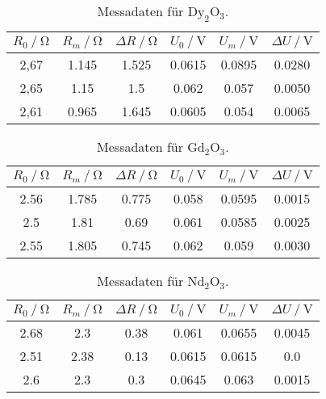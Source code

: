 \begin{table}[H]
    \centering
    \caption{Messadaten für $\text{Dy}_2 \text{O}_3$.}
    \label{tab:tab3}
    \begin{tabular}{S S S S S S}
      \toprule
        {$ R_0 \mathbin{/} \unit{\ohm} $}&{$R_m \mathbin{/} \unit{\ohm} $}&{$ \Delta R \mathbin{/} \unit{\ohm}$}&{$ U_0 \mathbin{/} \unit{\volt}$}&{$U_m \mathbin{/} \unit{\volt}$}&{$\Delta U \mathbin{/} \unit{\volt}$}\\
        \midrule
        {2,67} & {1.145}&  {1.525}&{0.0615}&{0.0895}&{0.0280}\\
        {2,65} & {1.15} &   {1.5} &{0.062} &{0.057} &{0.0050}\\
        {2,61} & {0.965}&  {1.645}&{0.0605}&{0.054} &{0.0065}\\
      \bottomrule
    \end{tabular}
\end{table}

\begin{table}[H]
    \centering
    \caption{Messadaten für $\text{Gd}_2 \text{O}_3$.}
    \label{tab:tab4}
    \begin{tabular}{S S S S S S}
      \toprule
        {$ R_0 \mathbin{/} \unit{\ohm} $}&{$R_m \mathbin{/} \unit{\ohm} $}&{$ \Delta R \mathbin{/} \unit{\ohm}$}&{$ U_0 \mathbin{/} \unit{\volt}$}&{$U_m \mathbin{/} \unit{\volt}$}&{$\Delta U \mathbin{/} \unit{\volt}$}\\
        \midrule
        {2.56} & {1.785}&  {0.775}&{0.058}&{0.0595}&{0.0015}\\
        {2.5}  & { 1.81}&   {0.69} &{0.061}&{0.0585} &{0.0025}\\
        {2.55} & {1.805}&  {0.745}&{0.062}&{0.059} &{0.0030}\\
      \bottomrule
    \end{tabular}
\end{table}

\begin{table}[H]
    \centering
    \caption{Messadaten für $\text{Nd}_2 \text{O}_3$.}
    \label{tab:tab5}
    \begin{tabular}{S S S S S S}
      \toprule
        {$ R_0 \mathbin{/} \unit{\ohm} $}&{$R_m \mathbin{/} \unit{\ohm} $}&{$ \Delta R \mathbin{/} \unit{\ohm}$}&{$ U_0 \mathbin{/} \unit{\volt}$}&{$U_m \mathbin{/} \unit{\volt}$}&{$\Delta U \mathbin{/} \unit{\volt}$}\\
        \midrule
        {2.68} & {2.3} &  {0.38}&{0.061} &{0.0655}&{0.0045}\\
        {2.51} & {2.38}&  {0.13}&{0.0615}&{0.0615}&{0.0}\\
        {2.6}  & {2.3} &  {0.3} &{0.0645}&{0.063} &{0.0015}\\
      \bottomrule
    \end{tabular}
\end{table}

